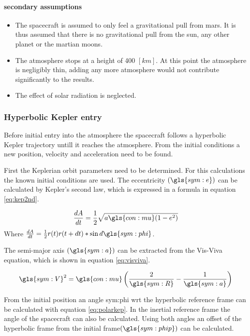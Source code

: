  
 \paragraph{secondary assumptions}
 \begin{itemize}
 \item The spacecraft is assumed to only feel a gravitational pull from mars. It is thus assumed that there is no gravitational pull from the sun, any other planet or the martian moons.
 \item The atmosphere stops at a height of 400 $\left[km\right]$. At this point the atmosphere is negligibly thin, adding any more atmosphere would not contribute significantly to the results.
 \item The effect of solar radiation is neglected.
 \end{itemize}
 
\subsubsection{Hyperbolic Kepler entry}
 \label{sec:hypkep}
Before initial entry into the atmosphere the spacecraft follows a hyperbolic Kepler trajectory untill it reaches the atmosphere. From the initial conditions a new position, velocity and acceleration need to be found. 

First the Keplerian orbit parameters need to be determined. For this calculations the known initial conditions are used. The eccentricity $\left(\gls{sym:e}\right)$ can be calculated by Kepler's second law, which is expressed in a formula in equation \ref{eq:kep2nd}.

\begin{equation}
\frac{dA}{dt} = \frac{1}{2}\sqrt{a\gls{con:mu}(1-e^2)}
\label{eq:kep2nd}
\end{equation}
Where $\frac{dA}{dt} = \frac{1}{2}r(t)r(t+dt)*\sin{d\gls{sym:phi}}$.

The semi-major axis $\left(\gls{sym:a}\right)$ can be extracted from the Vis-Viva equation, which is shown in equation \ref{eq:visviva}.

\begin{equation}
\gls{sym:V}^2 = \gls{con:mu}\left(\frac{2}{\gls{sym:R}}-\frac{1}{\gls{sym:a}}\right)
\label{eq:visviva}
\end{equation}

From the initial position an angle \gls{sym:phi} wrt the hyperbolic reference frame can be calculated with equation \ref{eq:polarkep}. In the inertial reference frame the angle of the spacecraft can also be calculated. Using both angles an offset of the hyperbolic frame from the initial frame$\left (\gls{sym:phip}\right)$ can be calculated.

